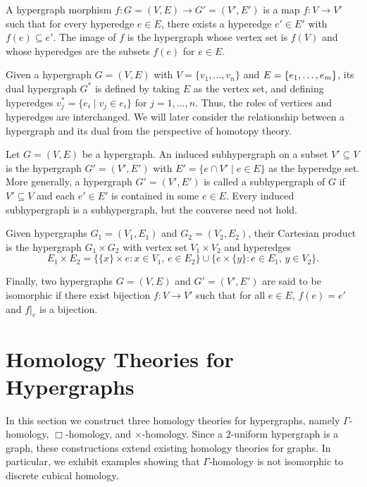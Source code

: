 \documentclass[11pt]{amsart}
\begin{document}
A hypergraph morphism $f \colon G=(V,E) \to G'=(V',E')$ is a map $f \colon V \to V'$ such that for every hyperedge $e \in E$, there exists a hyperedge $e' \in E'$ with $f(e) \subseteq e'$. The image of $f$ is the hypergraph whose vertex set is $f(V)$ and whose hyperedges are the subsets $f(e)$ for $e \in E$.

Given a hypergraph $G=(V,E)$ with $V=\{v_1,\dots,v_n\}$ and $E=\{e_1,\dots,\\ e_m\}$, its dual hypergraph $G^*$ is defined by taking $E$ as the vertex set, and defining hyperedges $v_j^* = \{ e_i \mid v_j \in e_i \}$ for $j=1,\dots,n$. Thus, the roles of vertices and hyperedges are interchanged. We will later consider the relationship between a hypergraph and its dual from the perspective of homotopy theory.

Let $G=(V,E)$ be a hypergraph. An induced subhypergraph on a subset $V' \subseteq V$ is the hypergraph $G'=(V', E')$ with $E'=\{ e \cap V' \mid e \in E \}$ as the hyperedge set. More generally, a hypergraph $G'=(V',E')$ is called a subhypergraph of $G$ if $V' \subseteq V$ and each $e' \in E'$ is contained in some $e \in E$. Every induced subhypergraph is a subhypergraph, but the converse need not hold.

Given hypergraphs $G_1=(V_1,E_1)$ and $G_2=(V_2,E_2)$, their Cartesian product is the hypergraph $G_1 \times G_2$ with vertex set $V_1 \times V_2$ and hyperedges
\[
E_1 \times E_2 = \{ \{x\} \times e : x \in V_1,\, e \in E_2 \} \cup \{ e \times \{y\} : e \in E_1,\, y \in V_2 \}.
\]

Finally, two hypergraphs $G=(V,E)$ and $G'=(V',E')$ are said to be isomorphic if 
there exist bijection $f \colon V \to V'$  such that for all $e \in E$, $f(e)=e'$  and $f|_e$ is a bijection.

\section{Homology Theories for Hypergraphs}\label{ch.hom}

In this section we construct three homology theories for hypergraphs, namely $\Gamma$-homology, $\Box$-homology, and $\times$-homology. Since a $2$-uniform hypergraph is a graph, these constructions extend existing homology theories for graphs. In particular, we exhibit examples showing that $\Gamma$-homology is not isomorphic to discrete cubical homology.
\end{document}
